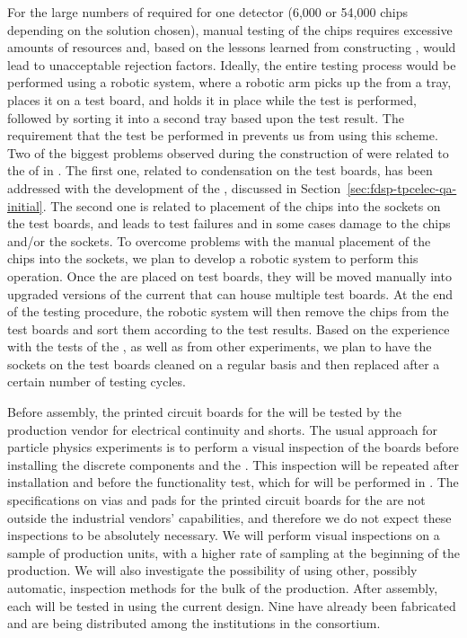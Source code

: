 For the large numbers of
 required for one    detector
(6,000 or 54,000 chips depending on the  solution
chosen), manual testing of the chips requires excessive 
amounts of resources and, based on the lessons learned from  
constructing  , would lead to unacceptable rejection
factors. Ideally, the entire testing
process would be performed using a robotic system, where 
a robotic arm picks up the  from a tray, places
it on a test board, and holds it in place while the test
is performed, followed by sorting it into a second tray
based upon the test result. The requirement that the test
be performed in \lntwo prevents us from using this
scheme. Two of the biggest problems observed during the
construction of  were related to the 
of  in \lntwo. The first one, related to
condensation on the test boards, has been addressed with
the development of the , discussed in Section~\ref{sec:fdsp-tpcelec-qa-initial}.
The second one is related to placement of the chips into the
sockets on the test boards, and leads to test failures
and in some cases damage to the chips and/or the sockets.
To overcome problems with the manual placement of the chips into
the sockets, we plan to develop a robotic system
to perform this operation. Once the  are 
placed on test boards, they will be moved manually into 
upgraded versions of the current  that can
house multiple test boards. At the end of the testing
procedure, the robotic system will then remove
the chips from the test boards and sort them according to
the test results. Based on the experience with the tests of
the  , as well as from other experiments,
we plan to have the sockets on the test boards cleaned on a regular 
basis and then replaced after a certain number of
testing cycles. 

Before assembly, the printed circuit boards for the
 will be tested by the production vendor for electrical
continuity and shorts. The usual approach for particle physics
experiments is to perform a visual inspection of the boards
before installing the discrete components and 
the . This inspection will be repeated after 
installation and before the functionality test, which for  will
be performed in \lntwo. The specifications on vias and pads for the printed
circuit boards for the  are not outside the 
industrial vendors' capabilities, and therefore we do not
expect these inspections to be absolutely necessary. We will
perform visual inspections on a sample of 
production units, with a higher rate of sampling at the beginning
of the production. We will also investigate the possibility
of using other, possibly automatic, inspection methods for
the bulk of the production. After assembly, 
each  will be tested in \lntwo using
the current  design. Nine  have already been
fabricated and are being distributed among the institutions
in the consortium. 

